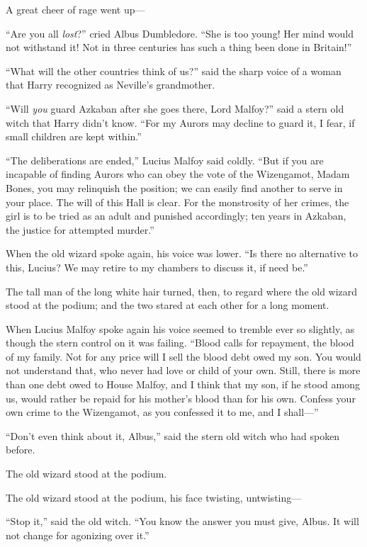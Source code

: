A great cheer of rage went up—

“Are you all \emph{lost}?” cried Albus Dumbledore. “She is too young! Her mind would not withstand it! Not in three centuries has such a thing been done in Britain!”

“What will the other countries think of us?” said the sharp voice of a woman that Harry recognized as Neville’s grandmother.

“Will \emph{you} guard Azkaban after she goes there, Lord Malfoy?” said a stern old witch that Harry didn’t know. “For my Aurors may decline to guard it, I fear, if small children are kept within.”

“The deliberations are ended,” Lucius Malfoy said coldly. “But if you are incapable of finding Aurors who can obey the vote of the Wizengamot, Madam Bones, you may relinquish the position; we can easily find another to serve in your place. The will of this Hall is clear. For the monstrosity of her crimes, the girl is to be tried as an adult and punished accordingly; ten years in Azkaban, the justice for attempted murder.”

When the old wizard spoke again, his voice was lower. “Is there no alternative to this, Lucius? We may retire to my chambers to discuss it, if need be.”

The tall man of the long white hair turned, then, to regard where the old wizard stood at the podium; and the two stared at each other for a long moment.

When Lucius Malfoy spoke again his voice seemed to tremble ever so slightly, as though the stern control on it was failing. “Blood calls for repayment, the blood of my family. Not for any price will I sell the blood debt owed my son. You would not understand that, who never had love or child of your own. Still, there is more than one debt owed to House Malfoy, and I think that my son, if he stood among us, would rather be repaid for his mother’s blood than for his own. Confess your own crime to the Wizengamot, as you confessed it to me, and I shall—”

“Don’t even think about it, Albus,” said the stern old witch who had spoken before.

The old wizard stood at the podium.

The old wizard stood at the podium, his face twisting, untwisting—

“Stop it,” said the old witch. “You know the answer you must give, Albus. It will not change for agonizing over it.”

